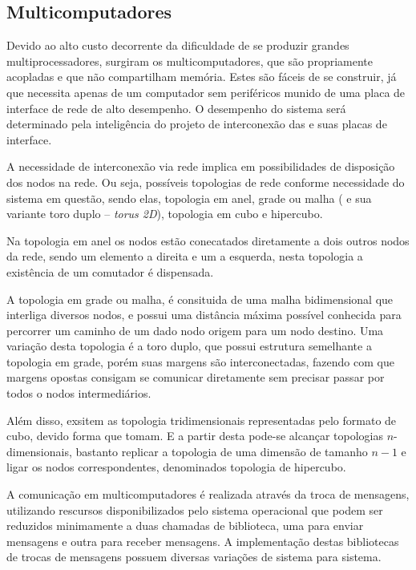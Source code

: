 \subsection{Multicomputadores}
\label{subsec:multicomputadores}

Devido ao alto custo decorrente da dificuldade de se produzir grandes multiprocessadores, surgiram os multicomputadores, que são \cpus propriamente acopladas e que não compartilham memória. Estes são fáceis de se construir, já que necessita apenas de um computador sem periféricos munido de uma placa de interface de rede de alto desempenho. O desempenho do sistema será determinado pela inteligência do projeto de interconexão das \cpus e suas placas de interface.

A necessidade de interconexão via rede implica em possibilidades de disposição dos nodos na rede. Ou seja, possíveis topologias de rede conforme necessidade do sistema em questão, sendo elas, topologia em anel, grade ou malha ( e sua variante toro duplo -- \textit{torus 2D}), topologia em cubo e hipercubo.

Na topologia em anel os nodos estão conecatados diretamente a dois outros nodos da rede, sendo um elemento a direita e um a esquerda, nesta topologia a existência de um comutador é dispensada.

A topologia em grade ou malha, é consituida de uma malha bidimensional que interliga diversos nodos, e possui uma distância máxima possível conhecida para percorrer um caminho de um dado nodo origem para um nodo destino. Uma variação desta topologia é a toro duplo, que possui estrutura semelhante a topologia em grade, porém suas margens são interconectadas, fazendo com que margens opostas consigam se comunicar diretamente sem precisar passar por todos o nodos intermediários.

Além disso, exsitem as topologia tridimensionais representadas pelo formato de cubo, devido forma que tomam. E a partir desta pode-se alcançar topologias $n$-dimensionais, bastanto replicar a topologia de uma dimensão de tamanho $n-1$ e ligar os nodos correspondentes, denominados topologia de hipercubo.

A comunicação em multicomputadores é realizada através da troca de mensagens, utilizando rescursos disponibilizados pelo sistema operacional que podem ser reduzidos minimamente a duas chamadas de biblioteca, uma para enviar mensagens e outra para receber mensagens. A implementação destas bibliotecas de trocas de mensagens possuem diversas variações de sistema para sistema. 

